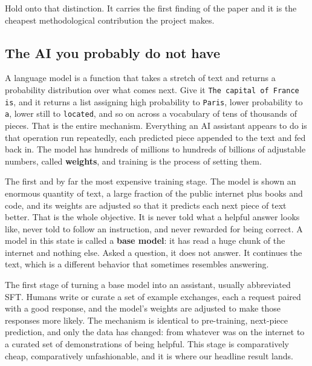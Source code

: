 \documentclass[11pt]{article}
\newcommand{\term}[1]{\textbf{\color{purpledk}#1}}
\begin{document}
Hold onto that distinction. It carries the first finding of the paper and it is the cheapest
methodological contribution the project makes.

\subsection{The AI you probably do not have}

\begin{keybox}
A language model is a function that takes a stretch of text and returns a probability
distribution over what comes next. Give it \texttt{The capital of France is}, and it returns a
list assigning high probability to \texttt{Paris}, lower probability to \texttt{a}, lower still
to \texttt{located}, and so on across a vocabulary of tens of thousands of pieces. That is the
entire mechanism. Everything an AI assistant appears to do is that operation run repeatedly,
each predicted piece appended to the text and fed back in. The model has hundreds of millions to
hundreds of billions of adjustable numbers, called \term{weights}, and training is the process of
setting them.
\end{keybox}

\begin{keybox}
The first and by far the most expensive training stage. The model is shown an enormous quantity
of text, a large fraction of the public internet plus books and code, and its weights are
adjusted so that it predicts each next piece of text better. That is the whole objective. It is
never told what a helpful answer looks like, never told to follow an instruction, and never
rewarded for being correct. A model in this state is called a \term{base model}: it has read a
huge chunk of the internet and nothing else. Asked a question, it does not answer. It continues
the text, which is a different behavior that sometimes resembles answering.
\end{keybox}

\begin{keybox}
The first stage of turning a base model into an assistant, usually abbreviated SFT. Humans write
or curate a set of example exchanges, each a request paired with a good response, and the model's
weights are adjusted to make those responses more likely. The mechanism is identical to
pre-training, next-piece prediction, and only the data has changed: from whatever was on the
internet to a curated set of demonstrations of being helpful. This stage is comparatively cheap,
comparatively unfashionable, and it is where our headline result lands.
\end{keybox}
\end{document}
